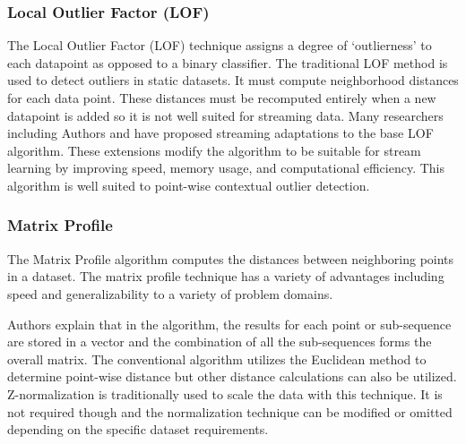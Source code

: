 

\subsubsection{Local Outlier Factor (LOF)}

The Local Outlier Factor (LOF) technique assigns a degree of `outlierness' to each datapoint as opposed to a binary classifier.
The traditional LOF method is used to detect outliers in static datasets.
It must compute neighborhood distances for each data point.
These distances must be recomputed entirely when a new datapoint is added so it is not well suited for streaming data.
Many researchers including Authors \cite{dilof-data-streams} and \cite{fast-memory-efficent-lof-milof} have proposed streaming adaptations to the base LOF algorithm.
These extensions modify the algorithm to be suitable for stream learning by improving speed, memory usage, and computational efficiency.
This algorithm is well suited to point-wise contextual outlier detection.

\subsubsection{Matrix Profile} 
\label{ref_matrix-profile-alg}
The Matrix Profile algorithm computes the distances between neighboring points in a dataset.
The matrix profile technique has a variety of advantages including speed and generalizability to a variety of problem domains.

Authors \cite{yeh2016matrix-profile-1} explain that in the algorithm, the results for each point or sub-sequence are stored in a vector and the combination of all the sub-sequences forms the overall matrix.
The conventional algorithm utilizes the Euclidean method to determine point-wise distance but other distance calculations can also be utilized.
Z-normalization is traditionally used to scale the data with this technique.
It is not required though and the normalization technique can be modified or omitted depending on the specific dataset requirements.

